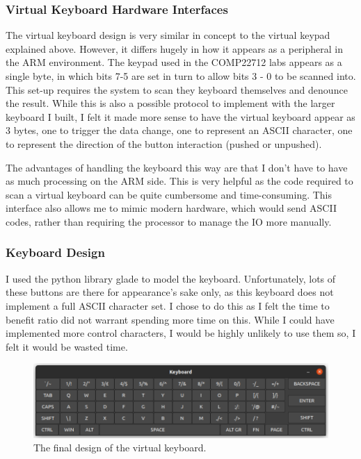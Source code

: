 \subsubsection{Virtual Keyboard Hardware Interfaces}
The virtual keyboard design is very similar in concept to the virtual keypad explained above. However, it differs hugely in how it appears as a peripheral in the ARM environment. The keypad used in the COMP22712 labs appears as a single byte, in which bits 7-5 are set in turn to allow bits 3 - 0 to be scanned into. This set-up requires the system to scan they keyboard themselves and denounce the result. While this is also a possible protocol to implement with the larger keyboard I built, I felt it made more sense to have the virtual keyboard appear as 3 bytes, one to trigger the data change, one to represent an ASCII character, one to represent the direction of the button interaction (pushed or unpushed).

The advantages of handling the keyboard this way are that I don't have to have as much processing on the ARM side. This is very helpful as the code required to scan a virtual keyboard can be quite cumbersome and time-consuming. This interface also allows me to mimic modern hardware, which would send ASCII codes, rather than requiring the processor to manage the IO more manually. 
\subsubsection{Keyboard Design}
I used the python library glade to model the keyboard. Unfortunately, lots of these buttons are there for appearance's sake only, as this keyboard does not implement a full ASCII character set. I chose to do this as I felt the time to benefit ratio did not warrant spending more time on this. While I could have implemented more control characters, I would be highly unlikely to use them so, I felt it would be wasted time. 

\begin{figure}[ht!]
	\includegraphics[width=\linewidth]{figures/keyboard.png}
	\caption{The final design of the virtual keyboard.}
	\label{fig:keyboard}
\end{figure} 
 
